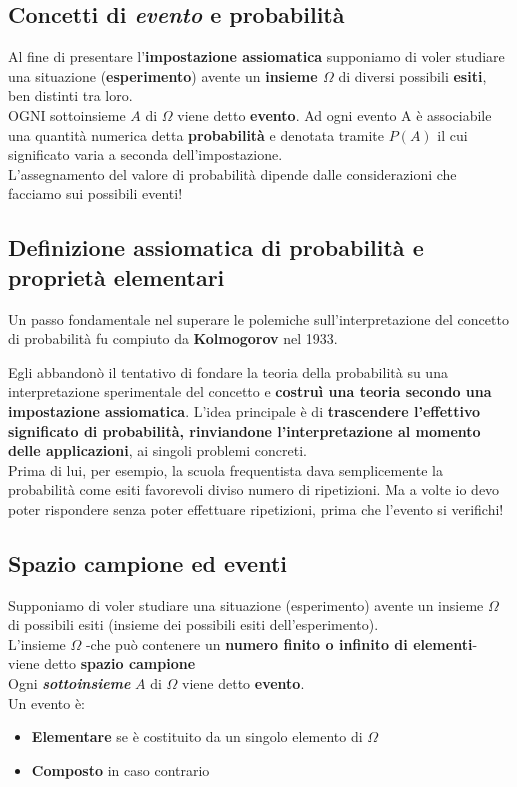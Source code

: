 \subsection{Concetti di \textit{evento} e \textbf{probabilità}}
Al fine di presentare l’\textbf{impostazione assiomatica} supponiamo di voler studiare una situazione (\textbf{esperimento}) avente un \textbf{insieme $\Omega$} di diversi possibili \textbf{esiti}, ben distinti tra loro. \\
OGNI sottoinsieme $A$ di $\Omega$ viene detto \textbf{evento}.
Ad ogni evento A è associabile una quantità numerica detta \textbf{probabilità}
e denotata tramite $P(A)$ il cui significato varia a seconda dell’impostazione. \\
L'assegnamento del valore di probabilità dipende dalle considerazioni che facciamo sui possibili eventi!


\subsection{Definizione assiomatica di probabilità e proprietà elementari}
Un passo fondamentale nel superare le polemiche sull'interpretazione del concetto di probabilità fu compiuto da \textbf{Kolmogorov} nel 1933.

Egli abbandonò il tentativo di fondare la teoria della probabilità su una interpretazione sperimentale del concetto e \textbf{costruì una teoria secondo una impostazione assiomatica}. L'idea principale è di \textbf{trascendere l'effettivo significato di probabilità, rinviandone l’interpretazione al momento delle applicazioni}, ai singoli problemi concreti. \\
Prima di lui, per esempio, la scuola frequentista dava semplicemente la probabilità come esiti favorevoli diviso numero di ripetizioni. Ma a volte io devo poter rispondere senza poter effettuare ripetizioni, prima che l'evento si verifichi!


\subsection{Spazio campione ed eventi}
Supponiamo di voler studiare una situazione (esperimento) avente un insieme $\Omega$ di possibili esiti (insieme dei possibili esiti dell'esperimento). \\
L'insieme $\Omega$ -che può contenere un \textbf{numero finito o infinito di elementi}- viene detto \textbf{spazio campione} \\
Ogni \textbf{\textit{sottoinsieme}} $A$ di $\Omega$ viene detto \textbf{evento}. \\
Un evento è:
\begin{itemize}
	\item \textbf{Elementare} se è costituito da un singolo elemento di $\Omega$
	\item \textbf{Composto} in caso contrario
\end{itemize}

